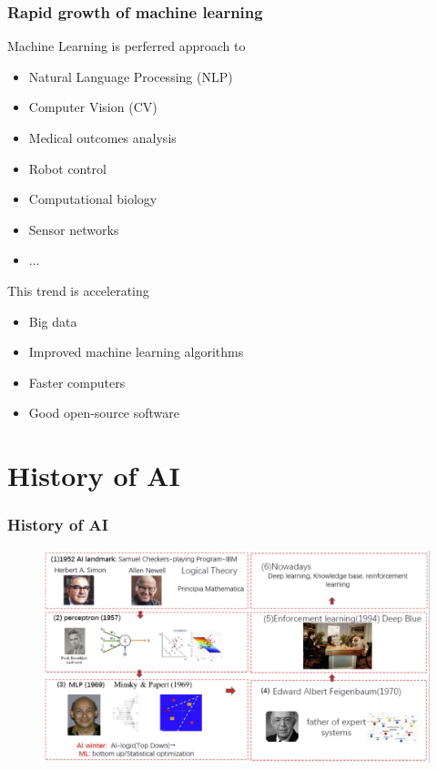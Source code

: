 \documentclass[9pt]{beamer}
\begin{document}
\begin{CJK*}{GBK}{kai}
\begin{frame}
\end{frame}
\begin{frame}
	\frametitle{Rapid growth of machine learning}
	\begin{block}{Machine Learning is perferred approach to}
		\begin{itemize}
			\item Natural Language Processing (NLP)
			\item Computer Vision (CV)			
			\item Medical outcomes analysis
			\item Robot control
			\item Computational biology
			\item Sensor networks
			\item ...
		\end{itemize}
	\end{block}
	
	\begin{block}{This trend is accelerating}
	\begin{itemize}
		\item Big data
		\item Improved machine learning algorithms
		\item Faster computers
		\item Good open-source software
	\end{itemize}
\end{block}
\end{frame}


\section{History of AI}
\begin{frame}
	\frametitle{History of AI}
	\begin{figure}[h]
		\centering
		\includegraphics[scale=0.35]{AIHistory.png}		
	\end{figure}
	

\end{frame}
\end{CJK*}
\end{document}
